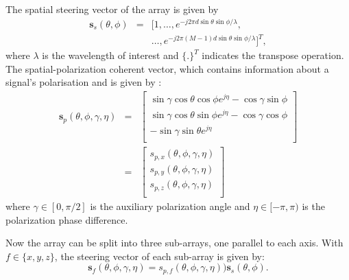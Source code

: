 \documentclass[10pt,final]{IEEEtran}
\begin{document}
The spatial steering vector of the array is given by
\begin{eqnarray}\nonumber
\label{eq:s_s}
    \textbf{s}_{s}(\theta,\phi)&=&[1, \ldots, e^{-j2\pi d\sin\theta\sin\phi/\lambda},\\  && \ldots, e^{-j2\pi(M-1)d\sin\theta\sin\phi/\lambda}]^{T},
\end{eqnarray}
where $\lambda$ is the wavelength of interest and $\{.\}^{T}$ indicates the transpose operation.  The spatial-polarization coherent vector, which contains information about
a signal's polarisation and is given by
\cite{Compton81b,Liu13a}:
\begin{eqnarray}\label{eq:s_p}\nonumber
\textbf{s}_{p}(\theta,\phi,\gamma,\eta) &=&
\left[
  \begin{array}{c}
    \sin\gamma\cos\theta\cos\phi e^{j\eta} - \cos\gamma\sin\phi \\
    \sin\gamma\cos\theta\sin\phi e^{j\eta} - \cos\gamma\cos\phi \\
    -\sin\gamma\sin\theta e^{j\eta} \\
  \end{array}
\right] \\  &=& \left[
  \begin{array}{c}
    s_{p,x}(\theta,\phi,\gamma,\eta) \\
    s_{p,y}(\theta,\phi,\gamma,\eta) \\
    s_{p,z}(\theta,\phi,\gamma,\eta) \\
  \end{array}
\right]
 \end{eqnarray}
where $\gamma\in[0,\pi/2]$ is the auxiliary polarization angle and
$\eta\in[-\pi,\pi)$ is the polarization phase difference.

Now the array can be split into three sub-arrays, one parallel to each axis. With $f\in\{x,y,z\}$, the steering vector of each sub-array is given by:
\begin{equation}\label{eq:s_x}
\textbf{s}_{f}(\theta,\phi,\gamma,\eta) =
 s_{p,f}(\theta,\phi,\gamma,\eta))\textbf{s}_{s}(\theta,\phi).
 \end{equation}
\end{document}
